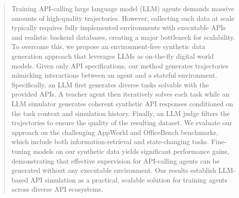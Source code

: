 \begin{abstract}
Training API-calling large language model (LLM) agents demands massive amounts of high-quality trajectories. However, collecting such data at scale typically requires fully implemented environments with executable APIs and realistic backend databases, creating a major bottleneck for scalability. To overcome this, we propose an environment-free synthetic data generation approach that leverages LLMs as on-the-fly digital world models. Given only API specifications, our method generates trajectories mimicking interactions between an agent and a stateful environment. Specifically, an LLM first generates diverse tasks solvable with the provided APIs. A teacher agent then iteratively solves each task while an LLM simulator generates coherent synthetic API responses conditioned on the task context and simulation history. Finally, an LLM judge filters the trajectories to ensure the quality of the resulting dataset. We evaluate our approach on the challenging AppWorld and OfficeBench benchmarks, which include both information-retrieval and state-changing tasks. Fine-tuning models on our synthetic data yields significant performance gains, demonstrating that effective supervision for API-calling agents can be generated without any executable environment. Our results establish LLM-based API simulation as a practical, scalable solution for training agents across diverse API ecosystems.
\end{abstract}